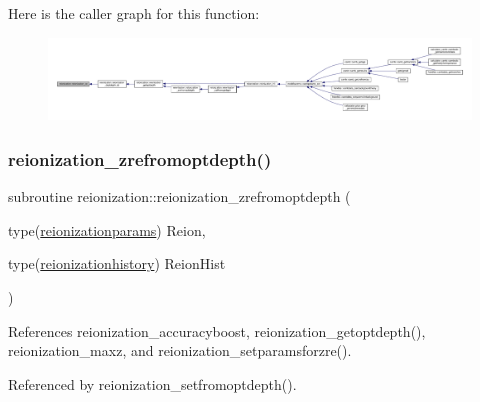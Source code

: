 Here is the caller graph for this function\+:
\nopagebreak
\begin{figure}[H]
\begin{center}
\leavevmode
\includegraphics[width=350pt]{namespacereionization_a2ed4204b4a8a9400f3e0b3a8f628b584_icgraph}
\end{center}
\end{figure}
\mbox{\label{namespacereionization_a00f14156cc08a86c4b28e0d21bc7cd2e}} 
\subsubsection{\texorpdfstring{reionization\+\_\+zrefromoptdepth()}{reionization\_zrefromoptdepth()}}
{\footnotesize\ttfamily subroutine reionization\+::reionization\+\_\+zrefromoptdepth (\begin{DoxyParamCaption}\item[{type(\mbox{\hyperlink{structreionization_1_1reionizationparams}{reionizationparams}})}]{Reion,  }\item[{type(\mbox{\hyperlink{structreionization_1_1reionizationhistory}{reionizationhistory}})}]{Reion\+Hist }\end{DoxyParamCaption})}



References reionization\+\_\+accuracyboost, reionization\+\_\+getoptdepth(), reionization\+\_\+maxz, and reionization\+\_\+setparamsforzre().



Referenced by reionization\+\_\+setfromoptdepth().

